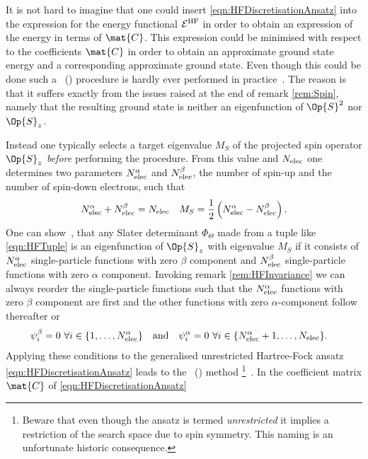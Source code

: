 \begin{rem}
	It is not hard to imagine
	that one could insert \eqref{eqn:HFDiscretisationAnsatz}
	into the expression for the \HF energy functional $\mathcal{E}^\text{HF}$
	in order to obtain an expression of the \HF energy
	in terms of $\mat{C}$.
	This expression could be minimised
	with respect to the coefficients $\mat{C}$
	in order to obtain an approximate
	\HF ground state energy and a corresponding approximate \HF ground state.
	Even though this could be done
	such a ~(\GUHF)
	procedure is hardly ever performed in practice~\cite{McWeeny1985}.
	The reason is that it suffers
	exactly from the issues raised at the end of remark \vref{rem:Spin},
	namely that the resulting \HF ground state
	is neither an eigenfunction of $\Op{S}^2$ nor $\Op{S}_z$.

	Instead one typically selects a target eigenvalue $M_S$
	of the projected spin operator $\Op{S}_z$ \emph{before}
	performing the \HF procedure.
	From this value and $N_\text{elec}$ one determines two parameters
	$N_\text{elec}^\alpha$ and $N_\text{elec}^\beta$,
	the number of spin-up and the number of spin-down electrons,
	such that
	\begin{align*}
		N_\text{elec}^\alpha + N_\text{elec}^\beta &= N_\text{elec} & M_S = \frac12 \left( N_\text{elec}^\alpha - N_\text{elec}^\beta\right).
	\end{align*}
	One can show~\cite{Szabo1996,Helgaker2013},
	that any Slater determinant $\Phi_\Theta$
	made from a tuple like \eqref{eqn:HFTuple}
	is an eigenfunction of $\Op{S}_z$ with eigenvalue $M_S$
	if it consists of $N_\text{elec}^\alpha$ single-particle functions with zero $\beta$
	component and $N_\text{elec}^\beta$ single-particle functions with zero $\alpha$ component.
	Invoking remark \vref{rem:HFInvariance}
	we can always reorder the single-particle functions
	such that the $N_\text{elec}^\alpha$ functions with zero $\beta$ component are first
	and the other functions with zero $\alpha$-component follow thereafter
	or
	\begin{align*}
		\psi_i^\beta  &= 0 \ \forall i \in \{1,\ldots,N_\text{elec}^\alpha\}
		&&\text{and}&
		\psi_i^\alpha  &= 0 \ \forall i \in \{N_\text{elec}^\alpha+1,\ldots,N_\text{elec}\}.
	\end{align*}
	Applying these conditions
	to the generalised unrestricted Hartree-Fock ansatz \eqref{eqn:HFDiscretisationAnsatz}
	leads to the ~(\UHF) method%
	\footnote{
		Beware that even though the \UHF ansatz is termed \emph{unrestricted}
		it implies a restriction of the search space due to spin symmetry.
		This naming is an unfortunate historic consequence.
	}~\cite{Pople1954}.
	In \UHF the coefficient matrix $\mat{C}$ of \eqref{eqn:HFDiscretisationAnsatz}

\end{rem}

